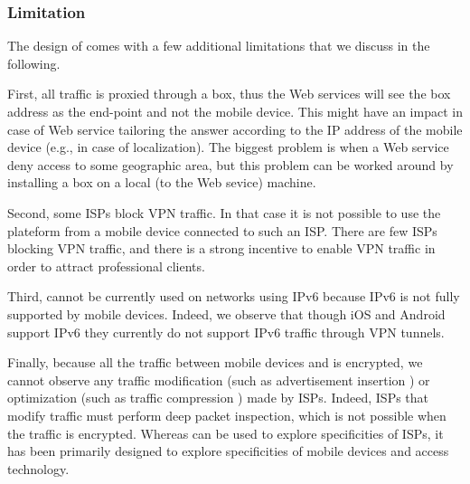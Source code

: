 
\subsubsection{Limitation}
The design of \platname{} comes with a few additional limitations that
we discuss in the following.

First, all traffic is proxied through a \platname{} box, thus the Web
services will see the \platname{} box address as the end-point and not
the mobile device. This might have an impact in case of Web service
tailoring the answer according to the IP address of the mobile device
(e.g., in case of localization). The biggest problem is when a Web
service deny access to some geographic area, but this problem can be
worked around by installing a \platname{} box on a local (to the Web
sevice) machine.

Second, some ISPs block VPN traffic. In that case it is not possible
to use the \platname{} plateform from a mobile device connected to
such an ISP. There are few ISPs blocking VPN traffic, and there is a
strong incentive to enable VPN traffic in order to attract
professional clients. 

Third, \platname{} cannot be currently used on networks using IPv6
because IPv6 is not fully supported by mobile devices. Indeed, we
observe that though iOS and Android support IPv6 they currently do not
support IPv6 traffic through VPN tunnels.

Finally, because all the traffic between mobile devices and \platname{}
is encrypted, we cannot observe any traffic modification (such as
advertisement insertion ) or optimization
(such as traffic compression ) made by
ISPs. Indeed, ISPs that modify traffic must perform deep packet
inspection, which is not possible when the traffic is
encrypted. Whereas \platname{} can be used to explore specificities of
ISPs, it has been primarily designed to explore specificities of
mobile devices and access technology. 


